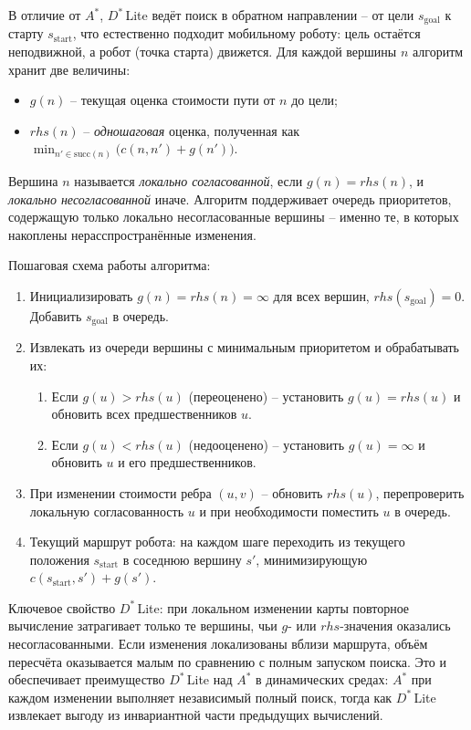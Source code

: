 \documentclass[a4paper,12pt]{extarticle}
\begin{document}
    В отличие от $A^*$, $D^*$\,Lite ведёт поиск в обратном направлении -- от цели $s_\text{goal}$ к старту $s_\text{start}$, что естественно подходит мобильному роботу: цель остаётся неподвижной, а робот (точка старта) движется. Для каждой вершины $n$ алгоритм хранит две величины:
    \begin{itemize}
        \item $g(n)$ -- текущая оценка стоимости пути от $n$ до цели;
        \item $rhs(n)$ -- \emph{одношаговая} оценка, полученная как $\min_{n' \in \text{succ}(n)} \bigl(c(n, n') + g(n')\bigr)$.
    \end{itemize}
    Вершина $n$ называется \emph{локально согласованной}, если $g(n) = rhs(n)$, и \emph{локально несогласованной} иначе. Алгоритм поддерживает очередь приоритетов, содержащую только локально несогласованные вершины -- именно те, в которых накоплены нерасспространённые изменения.

    Пошаговая схема работы алгоритма:
    \begin{enumerate}
        \item Инициализировать $g(n) = rhs(n) = \infty$ для всех вершин, $rhs(s_\text{goal}) = 0$. Добавить $s_\text{goal}$ в очередь.
        \item Извлекать из очереди вершины с минимальным приоритетом и обрабатывать их:
            \begin{enumerate}
                \item Если $g(u) > rhs(u)$ (переоценено) -- установить $g(u) = rhs(u)$ и обновить всех предшественников $u$.
                \item Если $g(u) < rhs(u)$ (недооценено) -- установить $g(u) = \infty$ и обновить $u$ и его предшественников.
            \end{enumerate}
        \item При изменении стоимости ребра $(u, v)$ -- обновить $rhs(u)$, перепроверить локальную согласованность $u$ и при необходимости поместить $u$ в очередь.
        \item Текущий маршрут робота: на каждом шаге переходить из текущего положения $s_\text{start}$ в соседнюю вершину $s'$, минимизирующую $c(s_\text{start}, s') + g(s')$.
    \end{enumerate}

    Ключевое свойство $D^*$\,Lite: при локальном изменении карты повторное вычисление затрагивает только те вершины, чьи $g$- или $rhs$-значения оказались несогласованными. Если изменения локализованы вблизи маршрута, объём пересчёта оказывается малым по сравнению с полным запуском поиска. Это и обеспечивает преимущество $D^*$\,Lite над $A^*$ в динамических средах: $A^*$ при каждом изменении выполняет независимый полный поиск, тогда как $D^*$\,Lite извлекает выгоду из инвариантной части предыдущих вычислений.
\end{document}
